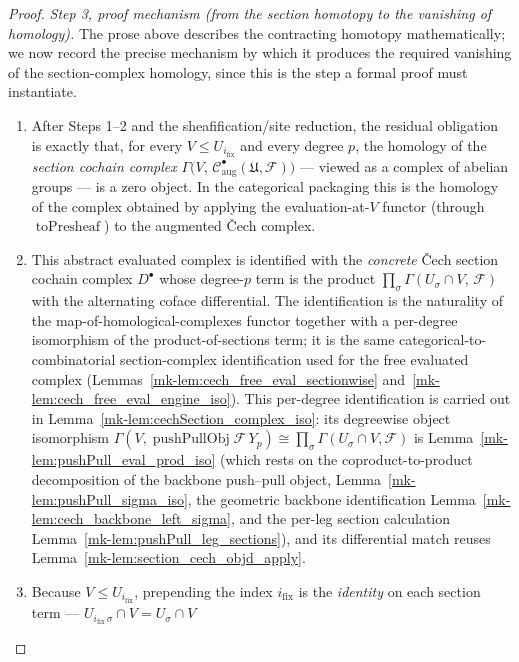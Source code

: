 \begin{proof}
  \emph{Step 3, proof mechanism (from the section homotopy to the vanishing of homology).} The prose
  above describes the contracting homotopy mathematically; we now record the precise mechanism by which it
  produces the required vanishing of the section-complex homology, since this is the step a formal proof
  must instantiate.
  \begin{enumerate}
    \item[(a)] After Steps 1--2 and the sheafification/site reduction, the residual obligation is exactly
      that, for every \(V \le U_{i_{\mathrm{fix}}}\) and every degree \(p\), the homology of the
      \emph{section cochain complex} \(\Gamma\bigl(V,\, \mathcal{C}^\bullet_{\mathrm{aug}}(\mathfrak{U},
      \mathcal{F})\bigr)\) --- viewed as a complex of abelian groups --- is a zero object. In the categorical
      packaging this is the homology of the complex obtained by applying the evaluation-at-\(V\) functor
      (through \(\operatorname{toPresheaf}\)) to the augmented {\v C}ech complex.
    \item[(b)] This abstract evaluated complex is identified with the \emph{concrete} {\v C}ech section
      cochain complex \(D^\bullet\) whose degree-\(p\) term is the product
      \(\prod_{\sigma} \Gamma(U_\sigma \cap V,\, \mathcal{F})\) with the alternating coface differential. The
      identification is the naturality of the map-of-homological-complexes functor together with a
      per-degree isomorphism of the product-of-sections term; it is the same
      categorical-to-combinatorial section-complex identification used for the free evaluated complex
      (Lemmas~\ref{mk-lem:cech_free_eval_sectionwise} and~\ref{mk-lem:cech_free_eval_engine_iso}). This per-degree
      identification is carried out in
      Lemma~\ref{mk-lem:cechSection_complex_iso}: its degreewise object isomorphism
      \(\Gamma(V, \operatorname{pushPullObj}\mathcal{F}\,Y_p) \cong \prod_\sigma \Gamma(U_\sigma \cap V,
      \mathcal{F})\) is Lemma~\ref{mk-lem:pushPull_eval_prod_iso} (which rests on the coproduct-to-product
      decomposition of the backbone push--pull object, Lemma~\ref{mk-lem:pushPull_sigma_iso}, the geometric
      backbone identification Lemma~\ref{mk-lem:cech_backbone_left_sigma}, and the per-leg section calculation
      Lemma~\ref{mk-lem:pushPull_leg_sections}), and its differential match reuses
      Lemma~\ref{mk-lem:section_cech_objd_apply}.
    \item[(c)] Because \(V \le U_{i_{\mathrm{fix}}}\), prepending the index \(i_{\mathrm{fix}}\) is the
      \emph{identity} on each section term --- \(U_{i_{\mathrm{fix}}\,\sigma} \cap V = U_\sigma \cap V\)

\end{enumerate}
\end{proof}

